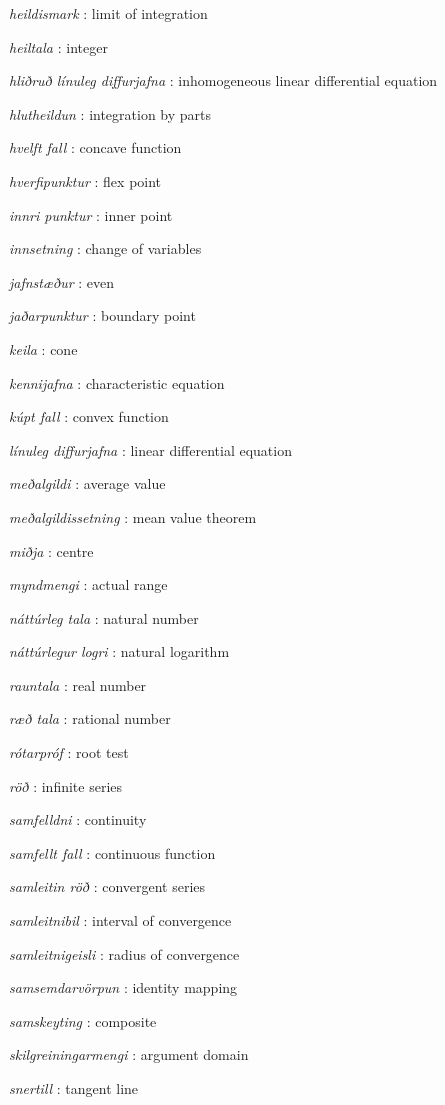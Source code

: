 \documentclass[b5paper,10pt,icelandic]{sphinxmanual}
\begin{document}
\emph{heildismark} : limit of integration


\emph{heiltala} : integer

\emph{hliðruð línuleg diffurjafna} : inhomogeneous linear differential equation

\emph{hlutheildun} : integration by parts

\emph{hvelft fall} : concave function


\emph{hverfipunktur} : flex point

\emph{innri punktur} : inner point

\emph{innsetning} : change of variables

\emph{jafnstæður} : even


\emph{jaðarpunktur} : boundary point

\emph{keila} : cone


\emph{kennijafna} : characteristic equation


\emph{kúpt fall} : convex function


\emph{línuleg diffurjafna} : linear differential equation


\emph{meðalgildi} : average value

\emph{meðalgildissetning} : mean value theorem


\emph{miðja} : centre

\emph{myndmengi} : actual range

\emph{náttúrleg tala} : natural number


\emph{náttúrlegur logri} : natural logarithm


\emph{rauntala} : real number


\emph{ræð tala} : rational number


\emph{rótarpróf} : root test


\emph{röð} : infinite series

\emph{samfelldni} : continuity


\emph{samfellt fall} : continuous function


\emph{samleitin röð} : convergent series


\emph{samleitnibil} : interval of convergence


\emph{samleitnigeisli} : radius of convergence


\emph{samsemdarvörpun} : identity mapping


\emph{samskeyting} : composite


\emph{skilgreiningarmengi} : argument domain

\emph{snertill} : tangent line
\end{document}
